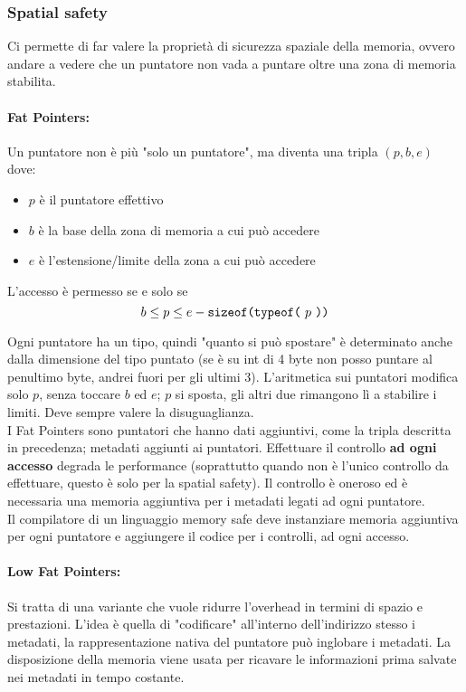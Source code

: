\subsubsection{Spatial safety}
Ci permette di far valere la proprietà di sicurezza spaziale della memoria, ovvero andare a vedere che un puntatore non vada a puntare oltre una zona di memoria stabilita.\\

\paragraph{Fat Pointers:} Un puntatore non è più "solo un puntatore", ma diventa una tripla $(p,b,e)$ dove: 
\label{par:fat-pointers}
\begin{itemize}
	\item $p$ è il puntatore effettivo
	\item $b$ è la base della zona di memoria a cui può accedere
	\item $e$ è l'estensione/limite della zona a cui può accedere
\end{itemize}

L'accesso è permesso se e solo se 
$$b \leq p \leq e - \text{\texttt{sizeof(typeof(} $p$ \text{\texttt{))}}} $$

Ogni puntatore ha un tipo, quindi "quanto si può spostare" è determinato anche dalla dimensione del tipo puntato (se è su int di 4 byte non posso puntare al penultimo byte, andrei fuori per gli ultimi 3). L'aritmetica sui puntatori modifica solo $p$, senza toccare $b$ ed $e$; $p$ si sposta, gli altri due rimangono lì a stabilire i limiti. Deve sempre valere la disuguaglianza.\\

I Fat Pointers sono puntatori che hanno dati aggiuntivi, come la tripla descritta in precedenza; metadati aggiunti ai puntatori.  Effettuare il controllo \textbf{ad ogni accesso} degrada le performance (soprattutto quando non è l'unico controllo da effettuare, questo è solo per la spatial safety). Il controllo è oneroso ed è necessaria una memoria aggiuntiva per i metadati legati ad ogni puntatore.\\
Il compilatore di un linguaggio memory safe deve instanziare memoria aggiuntiva per ogni puntatore e aggiungere il codice per i controlli, ad ogni accesso.\\

\newpage

\paragraph{Low Fat Pointers:} Si tratta di una variante che vuole ridurre l'overhead in termini di spazio e prestazioni. L'idea è quella di "codificare" all'interno dell'indirizzo stesso i metadati, la rappresentazione nativa del puntatore può inglobare i metadati. La disposizione della memoria viene usata per ricavare le informazioni prima salvate nei metadati in tempo costante.\\

